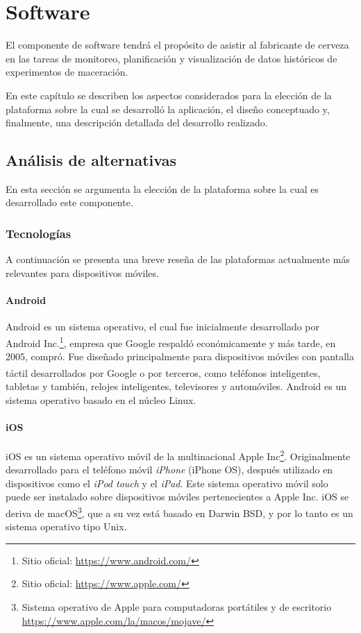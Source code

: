 \chapter{Software}
\label{CapituloSoftware}
\par El componente de software tendrá el propósito de asistir al fabricante de cerveza en las tareas de monitoreo, planificación y visualización de datos históricos de experimentos de maceración.

\par En este capítulo se describen los aspectos considerados para la elección de la plataforma sobre la cual se desarrolló la aplicación, el diseño conceptuado y, finalmente, una descripción detallada del desarrollo realizado.

\section{Análisis de alternativas}
    En esta sección se argumenta la elección de la plataforma sobre la cual es desarrollado este componente.
    
    \subsection{Tecnologías}
        \par A continuación se presenta una breve reseña de las plataformas actualmente más relevantes para dispositivos móviles.
        
        \subsubsection{Android}
            \par Android es un sistema operativo, el cual fue inicialmente desarrollado por Android Inc.\footnote{Sitio oficial: \url{https://www.android.com/}}, empresa que Google\textsuperscript{\textregistered} respaldó económicamente y más tarde, en 2005, compró. Fue diseñado principalmente para dispositivos móviles con pantalla táctil desarrollados por Google\textsuperscript{\textregistered} o por terceros, como teléfonos inteligentes, tabletas y también, relojes inteligentes, televisores y automóviles. Android es un sistema operativo basado en el núcleo Linux.
            
        \subsubsection{iOS}
            \par iOS es un sistema operativo móvil de la multinacional Apple Inc\footnote{Sitio oficial: \url{https://www.apple.com/}}. Originalmente desarrollado para el teléfono móvil \textit{iPhone} (iPhone OS), después utilizado en dispositivos como el \textit{iPod touch} y el \textit{iPad}. Este sistema operativo móvil solo puede ser instalado sobre dispositivos móviles pertenecientes a Apple Inc. iOS se deriva de macOS\footnote{Sistema operativo de Apple para computadoras portátiles y de escritorio \url{https://www.apple.com/la/macos/mojave/}}, que a su vez está basado en Darwin BSD, y por lo tanto es un sistema operativo tipo Unix.
            
